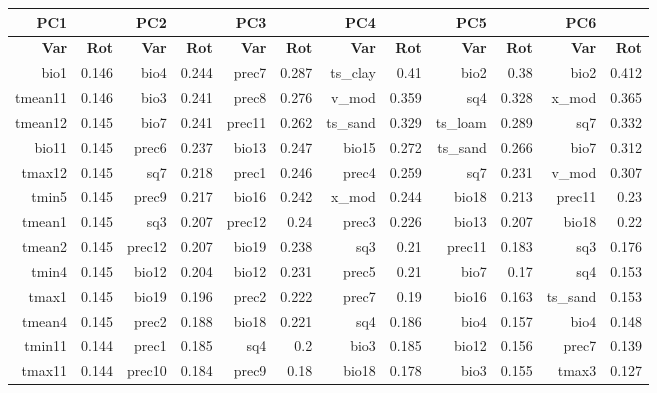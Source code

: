 \documentclass[11pt]{article}
\begin{document}
\begin{linenumbers}
\begin{flushleft}
\begin{table}[htbp]
  \centering
    \begin{tabular}{rrrrrrrrrrrr}
    \toprule
    \textbf{PC1} & \textbf{} & \textbf{PC2} & \textbf{} & \textbf{PC3} & \textbf{} & \textbf{PC4} & \textbf{} & \textbf{PC5} & \textbf{} & \textbf{PC6} & \textbf{} \\
    \midrule
    \textbf{Var} & \textbf{Rot} & \textbf{Var} & \textbf{Rot} & \textbf{Var} & \textbf{Rot} & \textbf{Var} & \textbf{Rot} & \textbf{Var} & \textbf{Rot} & \textbf{Var} & \textbf{Rot} \\
    bio1  & 0.146 & bio4  & 0.244 & prec7 & 0.287 & ts\_clay & 0.41  & bio2  & 0.38  & bio2  & 0.412 \\
    tmean11 & 0.146 & bio3  & 0.241 & prec8 & 0.276 & v\_mod & 0.359 & sq4   & 0.328 & x\_mod & 0.365 \\
    tmean12 & 0.145 & bio7  & 0.241 & prec11 & 0.262 & ts\_sand & 0.329 & ts\_loam & 0.289 & sq7   & 0.332 \\
    bio11 & 0.145 & prec6 & 0.237 & bio13 & 0.247 & bio15 & 0.272 & ts\_sand & 0.266 & bio7  & 0.312 \\
    tmax12 & 0.145 & sq7   & 0.218 & prec1 & 0.246 & prec4 & 0.259 & sq7   & 0.231 & v\_mod & 0.307 \\
    tmin5 & 0.145 & prec9 & 0.217 & bio16 & 0.242 & x\_mod & 0.244 & bio18 & 0.213 & prec11 & 0.23 \\
    tmean1 & 0.145 & sq3   & 0.207 & prec12 & 0.24  & prec3 & 0.226 & bio13 & 0.207 & bio18 & 0.22 \\
    tmean2 & 0.145 & prec12 & 0.207 & bio19 & 0.238 & sq3   & 0.21  & prec11 & 0.183 & sq3   & 0.176 \\
    tmin4 & 0.145 & bio12 & 0.204 & bio12 & 0.231 & prec5 & 0.21  & bio7  & 0.17  & sq4   & 0.153 \\
    tmax1 & 0.145 & bio19 & 0.196 & prec2 & 0.222 & prec7 & 0.19  & bio16 & 0.163 & ts\_sand & 0.153 \\
    tmean4 & 0.145 & prec2 & 0.188 & bio18 & 0.221 & sq4   & 0.186 & bio4  & 0.157 & bio4  & 0.148 \\
    tmin11 & 0.144 & prec1 & 0.185 & sq4   & 0.2   & bio3  & 0.185 & bio12 & 0.156 & prec7 & 0.139 \\
    tmax11 & 0.144 & prec10 & 0.184 & prec9 & 0.18  & bio18 & 0.178 & bio3  & 0.155 & tmax3 & 0.127 \\

\end{tabular}
\end{table}
\end{flushleft}
\end{linenumbers}
\end{document}
